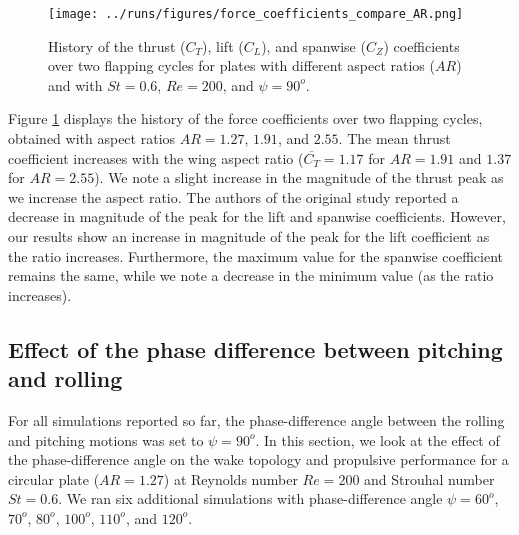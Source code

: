 \begin{figure}
  \centering
  \texttt{[image: ../runs/figures/force\_coefficients\_compare\_AR.png]}
  \caption{History of the thrust ($C_T$), lift ($C_L$), and spanwise ($C_Z$) coefficients over two flapping cycles for plates with different aspect ratios ($AR$) and with $St = 0.6$, $Re = 200$, and $\psi = 90^o$.}
  \label{fig:ratio_force_coefficients}
\end{figure}

Figure \ref{fig:ratio_force_coefficients} displays the history of the force coefficients over two flapping cycles, obtained with aspect ratios $AR = 1.27$, $1.91$, and $2.55$.
The mean thrust coefficient increases with the wing aspect ratio ($\overline{C_T} = 1.17$ for $AR = 1.91$ and $1.37$ for $AR = 2.55$).
We note a slight increase in the magnitude of the thrust peak as we increase the aspect ratio.
The authors of the original study reported a decrease in magnitude of the peak for the lift and spanwise coefficients.
However, our results show an increase in magnitude of the peak for the lift coefficient as the ratio increases.
Furthermore, the maximum value for the spanwise coefficient remains the same, while we note a decrease in the minimum value (as the ratio increases).

\subsection{Effect of the phase difference between pitching and rolling}

For all simulations reported so far, the phase-difference angle between the rolling and pitching motions was set to $\psi = 90^o$.
In this section, we look at the effect of the phase-difference angle on the wake topology and propulsive performance for a circular plate ($AR = 1.27$) at Reynolds number $Re = 200$ and Strouhal number $St = 0.6$.
We ran six additional simulations with phase-difference angle $\psi = 60^o$, $70^o$, $80^o$, $100^o$, $110^o$, and $120^o$.

